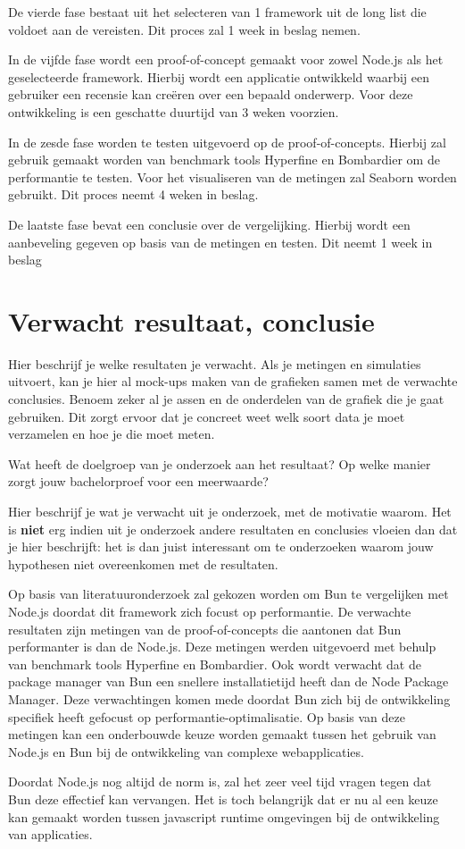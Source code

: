 De vierde fase bestaat uit het selecteren van 1 framework uit de long list die voldoet aan de vereisten. 
Dit proces zal 1 week in beslag nemen.

In de vijfde fase wordt een proof-of-concept gemaakt voor zowel Node.js als het geselecteerde framework. 
Hierbij wordt een applicatie ontwikkeld waarbij een gebruiker een recensie kan creëren over een bepaald onderwerp.
Voor deze ontwikkeling is een geschatte duurtijd van 3 weken voorzien.

In de zesde fase worden te testen uitgevoerd op de proof-of-concepts. 
Hierbij zal gebruik gemaakt worden van benchmark tools Hyperfine en Bombardier om de performantie te testen.
Voor het visualiseren van de metingen zal Seaborn worden gebruikt.
Dit proces neemt 4 weken in beslag.

De laatste fase bevat een conclusie over de vergelijking. 
Hierbij wordt een aanbeveling gegeven op basis van de metingen en testen.
Dit neemt 1 week in beslag
\section{Verwacht resultaat, conclusie}%
\label{sec:verwachte_resultaten}

Hier beschrijf je welke resultaten je verwacht. Als je metingen en simulaties uitvoert, 
kan je hier al mock-ups maken van de grafieken samen met de verwachte conclusies. 
Benoem zeker al je assen en de onderdelen van de grafiek die je gaat gebruiken. 
Dit zorgt ervoor dat je concreet weet welk soort data je moet verzamelen en hoe je die moet meten.

Wat heeft de doelgroep van je onderzoek aan het resultaat? Op welke manier zorgt jouw bachelorproef voor een meerwaarde?

Hier beschrijf je wat je verwacht uit je onderzoek, met de motivatie waarom.
Het is \textbf{niet} erg indien uit je onderzoek andere resultaten en conclusies vloeien dan dat je hier beschrijft: 
het is dan juist interessant om te onderzoeken waarom jouw hypothesen niet overeenkomen met de resultaten.

Op basis van literatuuronderzoek zal gekozen worden om Bun te vergelijken met Node.js doordat dit framework zich focust op performantie.
De verwachte resultaten zijn metingen van de proof-of-concepts die aantonen dat Bun performanter is dan de Node.js. 
Deze metingen werden uitgevoerd met behulp van benchmark tools Hyperfine en Bombardier.
Ook wordt verwacht dat de package manager van Bun een snellere installatietijd heeft dan de Node Package Manager.
Deze verwachtingen komen mede doordat Bun zich bij de ontwikkeling specifiek heeft gefocust op performantie-optimalisatie.
Op basis van deze metingen kan een onderbouwde keuze worden gemaakt tussen het gebruik van Node.js en Bun bij de ontwikkeling
van complexe webapplicaties.

Doordat Node.js nog altijd de norm is, zal het zeer veel tijd vragen tegen dat Bun deze effectief kan vervangen.
Het is toch belangrijk dat er nu al een keuze kan gemaakt worden tussen javascript runtime
omgevingen bij de ontwikkeling van applicaties.

